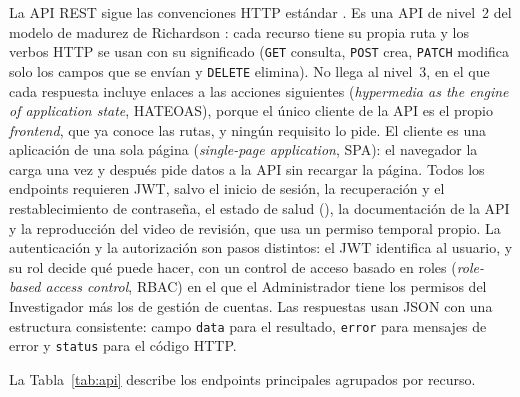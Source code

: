 La API REST sigue las convenciones HTTP estándar \cite{rfc9110,rfc5789}. Es una API de
nivel~2 del modelo de madurez de Richardson \cite{richardson2008,fowler2010}: cada recurso tiene su propia ruta y los
verbos HTTP se usan con su significado (\texttt{GET} consulta, \texttt{POST} crea,
\texttt{PATCH} modifica solo los campos que se envían y \texttt{DELETE} elimina). No
llega al nivel~3, en el que cada respuesta incluye enlaces a las acciones siguientes
(\textit{hypermedia as the engine of application state}, HATEOAS), porque el único
cliente de la API es el propio \textit{frontend}, que ya conoce las rutas, y ningún requisito
lo pide. El
cliente es una aplicación de una sola página (\textit{single-page application}, SPA):
el navegador la carga una vez y después pide datos a la API sin recargar la página.
Todos los endpoints requieren JWT, salvo el inicio de sesión, la recuperación y el restablecimiento de contraseña, el estado de salud (), la documentación de la API y la reproducción del video de revisión, que usa un permiso temporal propio. La autenticación y la autorización son pasos distintos: el
JWT identifica al usuario, y su rol decide qué puede hacer, con un control de acceso
basado en roles (\textit{role-based access control}, RBAC) en el que el Administrador
tiene los permisos del Investigador más los de gestión de cuentas. Las respuestas usan
JSON con una estructura consistente: campo \texttt{data} para el resultado,
\texttt{error} para mensajes de error y \texttt{status} para el código HTTP.

La Tabla~\ref{tab:api} describe los endpoints principales agrupados por recurso.

